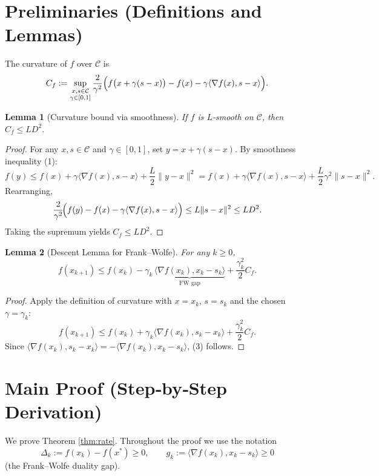 \documentclass{article}
\newtheorem{lemma}{Lemma}
\begin{document}
\section*{Preliminaries (Definitions and Lemmas)}
\begin{definition}\label{def:curv}
The curvature of $f$ over $\mathcal C$ is
\[
C_{f}:=
\sup_{\substack{x,s\in\mathcal C\\ \gamma\in[0,1]}}
\frac{2}{\gamma^{2}}\Bigl(
f\bigl(x+\gamma(s-x)\bigr)-f(x)-\gamma\langle\nabla f(x),s-x\rangle
\Bigr).
\]
\end{definition}
\begin{lemma}[Curvature bound via smoothness]\label{lem:curv}
If $f$ is $L$‑smooth on $\mathcal C$, then $C_{f}\le L D^{2}$.
\end{lemma}
\begin{proof}
For any $x,s\in\mathcal C$ and $\gamma\in[0,1]$, set $y=x+\gamma(s-x)$.
By smoothness inequality (1):
\[
f(y)\le f(x)+\gamma\langle\nabla f(x),s-x\rangle
       +\frac{L}{2}\|y-x\|^{2}
     = f(x)+\gamma\langle\nabla f(x),s-x\rangle
       +\frac{L}{2}\gamma^{2}\|s-x\|^{2}.
\]
Rearranging,
\[
\frac{2}{\gamma^{2}}\!\Bigl(f(y)-f(x)-\gamma\langle\nabla f(x),s-x\rangle\Bigr)
\le L\|s-x\|^{2}\le L D^{2}.
\]
Taking the supremum yields $C_{f}\le L D^{2}$.\qedhere
\end{proof}
\begin{lemma}[Descent Lemma for Frank–Wolfe]\label{lem:descent}
For any $k\ge0$,
\[
f(x_{k+1})\le f(x_{k})-\gamma_{k}\,
\underbrace{\bigl\langle\nabla f(x_{k}),x_{k}-s_{k}\bigr\rangle}_{\displaystyle\text{FW gap}}
+\frac{\gamma_{k}^{2}}{2}C_{f}.
\tag{3}
\]
\end{lemma}
\begin{proof}
Apply the definition of curvature with $x=x_{k}$, $s=s_{k}$ and the chosen
$\gamma=\gamma_{k}$:
\[
f(x_{k+1})\le f(x_{k})+\gamma_{k}\langle\nabla f(x_{k}),s_{k}-x_{k}\rangle
               +\frac{\gamma_{k}^{2}}{2}C_{f}.
\]
Since $\langle\nabla f(x_{k}),s_{k}-x_{k}\rangle
      =-\langle\nabla f(x_{k}),x_{k}-s_{k}\rangle$, (3) follows.\qedhere
\end{proof}

\section*{Main Proof (Step‑by‑Step Derivation)}
We prove Theorem \ref{thm:rate}.  Throughout the proof we use the notation
\[
\Delta_{k}:=f(x_{k})-f(x^{*})\ge0,\qquad
g_{k}:=\langle\nabla f(x_{k}),x_{k}-s_{k}\rangle\ge0
\]
(the Frank–Wolfe duality gap).
\end{document}
